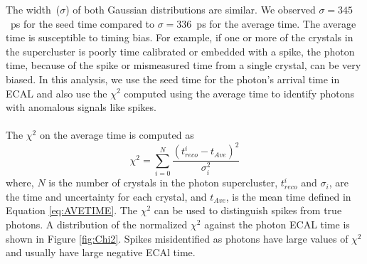 \vspace{5mm}
The width~($\sigma$) of both Gaussian distributions are similar. We observed $\sigma = 345$~ps for the seed time compared to $\sigma = 336$~ps for the average time. 
The average time is susceptible to timing bias. For example, if one or more of the crystals in the supercluster is poorly time calibrated or embedded with a spike, the photon time, because of the spike or mismeasured time from a single crystal, can be very biased.
 \newline
In this analysis, we use the seed time for the photon's arrival time in ECAL and also use the $\chi^{2}$ computed using the average time to identify photons with anomalous signals like spikes.
\paragraph*{}
The $\chi^{2}$ on the average time is computed as
\begin{equation}\label{eq:CHI2}
\chi^{2} = \sum^{N}_{i=0}\frac{(t^{i}_{reco} - t_{Ave})^{2}}{\sigma_{i}^{2}}
\end{equation}
where, $N$ is the number of crystals in the photon supercluster, $t^{i}_{reco}$ and $\sigma_{i}$, are the time and uncertainty  for each crystal, and $t_{Ave}$, is the mean time defined in Equation \ref{eq:AVETIME}. The $\chi^{2}$ can be used to distinguish spikes from true photons. A distribution of the normalized $\chi^{2}$ against the photon ECAL time is shown in Figure \ref{fig:Chi2}. Spikes misidentified as photons have large values of $\chi^{2}$ and usually have large negative ECAl time.
 
